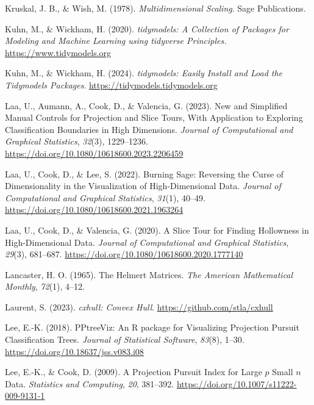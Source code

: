 \documentclass[
  letterpaper,
]{krantz}
\newlength{\cslhangindent}
\newenvironment{CSLReferences}[2] %
 {\begin{list}{}{%
  \setlength{\itemindent}{0pt}
  \setlength{\leftmargin}{0pt}
  \setlength{\parsep}{0pt}
  \ifodd #1
   \setlength{\leftmargin}{\cslhangindent}
   \setlength{\itemindent}{-1\cslhangindent}
  \fi
  \setlength{\itemsep}{#2\baselineskip}}}
 {\end{list}}
\begin{document}
\begin{CSLReferences}{1}{0}
Kruskal, J. B., \& Wish, M. (1978). \emph{Multidimensional {S}caling}.
Sage Publications.

Kuhn, M., \& Wickham, H. (2020). \emph{{tidymodels}: {A} {C}ollection of
{P}ackages for {M}odeling and {M}achine {L}earning using {tidyverse}
{P}rinciples.} \url{https://www.tidymodels.org}

Kuhn, M., \& Wickham, H. (2024). \emph{{tidymodels}: {E}asily {I}nstall
and {L}oad the {T}idymodels {P}ackages}.
\url{https://tidymodels.tidymodels.org}

Laa, U., Aumann, A., Cook, D., \& Valencia, G. (2023). New and
{S}implified {M}anual {C}ontrols for {P}rojection and {S}lice {T}ours,
{W}ith {A}pplication to {E}xploring {C}lassification {B}oundaries in
{H}igh {D}imensions. \emph{Journal of Computational and Graphical
Statistics}, \emph{32}(3), 1229--1236.
\url{https://doi.org/10.1080/10618600.2023.2206459}

Laa, U., Cook, D., \& Lee, S. (2022). Burning {S}age: {R}eversing the
{C}urse of {D}imensionality in the {V}isualization of
{H}igh-{D}imensional {D}ata. \emph{Journal of Computational and
Graphical Statistics}, \emph{31}(1), 40--49.
\url{https://doi.org/10.1080/10618600.2021.1963264}

Laa, U., Cook, D., \& Valencia, G. (2020). A {S}lice {T}our for
{F}inding {H}ollowness in {H}igh-{D}imensional {D}ata. \emph{Journal of
Computational and Graphical Statistics}, \emph{29}(3), 681--687.
\url{https://doi.org/10.1080/10618600.2020.1777140}

Lancaster, H. O. (1965). The {H}elmert {M}atrices. \emph{The American
Mathematical Monthly}, \emph{72}(1), 4--12.

Laurent, S. (2023). \emph{{cxhull}: {C}onvex {H}ull}.
\url{https://github.com/stla/cxhull}

Lee, E.-K. (2018). PPtreeViz: An {R} package for {V}isualizing
{P}rojection {P}ursuit {C}lassification {T}rees. \emph{Journal of
Statistical Software}, \emph{83}(8), 1--30.
\url{https://doi.org/10.18637/jss.v083.i08}

Lee, E.-K., \& Cook, D. (2009). A {P}rojection {P}ursuit {I}ndex for
{L}arge \(p\) {S}mall \(n\) {D}ata. \emph{Statistics and Computing},
\emph{20}, 381--392. \url{https://doi.org/10.1007/s11222-009-9131-1}


\end{CSLReferences}
\end{document}
